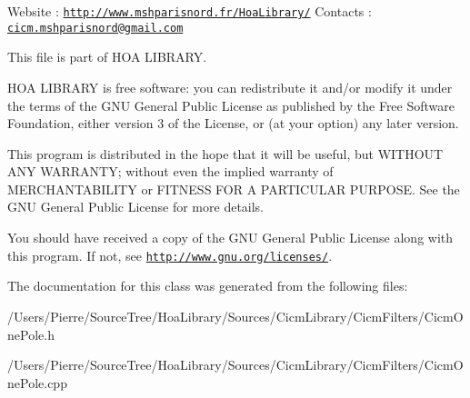 Website \-: \href{http://www.mshparisnord.fr/HoaLibrary/}{\tt http\-://www.\-mshparisnord.\-fr/\-Hoa\-Library/} Contacts \-: \href{mailto:cicm.mshparisnord@gmail.com}{\tt cicm.\-mshparisnord@gmail.\-com}

This file is part of H\-O\-A L\-I\-B\-R\-A\-R\-Y.

H\-O\-A L\-I\-B\-R\-A\-R\-Y is free software\-: you can redistribute it and/or modify it under the terms of the G\-N\-U General Public License as published by the Free Software Foundation, either version 3 of the License, or (at your option) any later version.

This program is distributed in the hope that it will be useful, but W\-I\-T\-H\-O\-U\-T A\-N\-Y W\-A\-R\-R\-A\-N\-T\-Y; without even the implied warranty of M\-E\-R\-C\-H\-A\-N\-T\-A\-B\-I\-L\-I\-T\-Y or F\-I\-T\-N\-E\-S\-S F\-O\-R A P\-A\-R\-T\-I\-C\-U\-L\-A\-R P\-U\-R\-P\-O\-S\-E. See the G\-N\-U General Public License for more details.

You should have received a copy of the G\-N\-U General Public License along with this program. If not, see \href{http://www.gnu.org/licenses/}{\tt http\-://www.\-gnu.\-org/licenses/}. 

The documentation for this class was generated from the following files\-:\begin{DoxyCompactItemize}
\item 
/\-Users/\-Pierre/\-Source\-Tree/\-Hoa\-Library/\-Sources/\-Cicm\-Library/\-Cicm\-Filters/Cicm\-One\-Pole.\-h\item 
/\-Users/\-Pierre/\-Source\-Tree/\-Hoa\-Library/\-Sources/\-Cicm\-Library/\-Cicm\-Filters/Cicm\-One\-Pole.\-cpp\end{DoxyCompactItemize}

